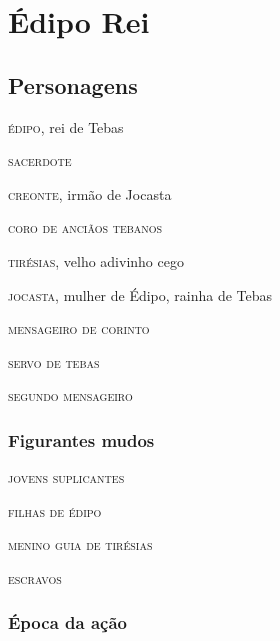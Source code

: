 


\renewcommand{\versal}[1]{{\normalfont\textsc{\MakeTextLowercase{#1}}}}
\newcommand{\saida}[1]{{\nobreak\hfill\textit{\mbox{$[$#1}}}}
\newcommand{\entrada}[1]{{\noindent\textit{#1\nolinebreak[2]}}}


\newcommand{\NL}[1]{%
 \marginpar[\raggedleft\tiny #1]{\raggedright\tiny #1}}

\newcommand{\personagem}[1]{\subsection{#1}}

\part{Édipo Rei}

\chapter{Personagens}

\vspace{-1cm}
\begingroup
\parindent0pt

\versal{Édipo,} rei de Tebas

\versal{Sacerdote}

\versal{Creonte,} irmão de Jocasta

\versal{Coro de anciãos tebanos}

\versal{Tirésias,} velho adivinho cego

\versal{Jocasta,} mulher de Édipo, rainha de Tebas

\versal{Mensageiro de Corinto}

\versal{Servo de Tebas}

\versal{Segundo Mensageiro}


\section{Figurantes mudos} 

\versal{Jovens suplicantes} 

\versal{Filhas de Édipo}

\versal{Menino guia de Tirésias}

\versal{Escravos}



\section{Época da ação} 

